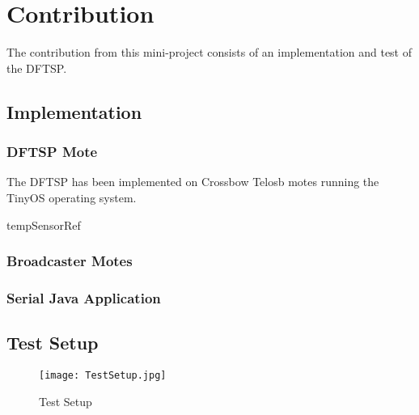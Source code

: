 \documentclass[Main]{subfiles}
\begin{document}
\section{Contribution} %
\label{sec:contribution}

	The contribution from this mini-project consists of an implementation and test of the DFTSP.

	\subsection{Implementation} %
	\label{sub:implementation}

		\subsubsection{DFTSP Mote} %
		\label{sub:dftsp_mote}
			The DFTSP has been implemented on Crossbow Telosb motes\cite{TelosBDatasheet:Online} running the TinyOS\cite{TinyOS:Online} operating system.

		tempSensorRef \cite{tempSensorDatasheet}
		
		
		\subsubsection{Broadcaster Motes} %
		\label{sub:broadcaster_mote}
		
	
		
		\subsubsection{Serial Java Application} %
		\label{sub:serial_java_application}
		


	\subsection{Test Setup} %
	\label{sub:test_setup}

		\begin{figure}[H]
			\centering
			\texttt{[image: TestSetup.jpg]}
			\caption{Test Setup}
			\label{fig:TestSetup}
		\end{figure}
	
\end{document}
